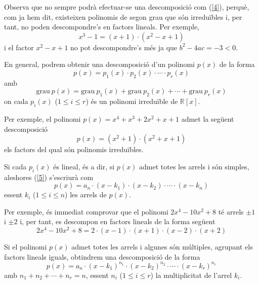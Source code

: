 Observa que no sempre podrà efectuar-se una descomposició com (\ref{4}), perquè, com ja hem dit, existeixen polinomis de segon grau que són
irreduïbles i, per tant, no poden descompondre's en factors lineals. Per exemple,
\begin{equation*}
x^{3}-1=(x+1)\cdot (x^{2}-x+1)
\end{equation*}i el factor $x^{2}-x+1$ no pot descompondre's més ja que $b^{2}-4ac=-3<0 $.

En general, podrem obtenir una descomposició d'un polinomi $p(x)$
de la forma\begin{equation}
p(x)=p_{1}(x)\cdot p_{2}(x)\cdot \cdots \cdot p_{r}(x) \label{5}
\end{equation}amb\begin{equation*}
\text{grau}~p(x)=\text{grau}~p_{1}(x)+\text{grau}~p_{2}(x)+\cdots +\text{grau}~p_{r}(x)
\end{equation*}on cada $p_{i}(x)$ ($1\leq i\leq r$) és un polinomi irreduïble de $\mathbb{R}[x]$.

Per exemple, el polinomi $p(x)=x^{4}+x^{3}+2x^{2}+x+1$ admet la següent
descomposició
\begin{equation*}
p(x)=(x^{2}+1)\cdot (x^{2}+x+1)
\end{equation*}els factors del qual són polinomis irreduïbles.

Si cada $p_{i}(x)$ és lineal, és a dir, si $p(x)$ admet totes les arrels i són simples, aleshores (\ref{5}) s'escriurà com\begin{equation*}
p(x)=a_{n}\cdot (x-k_{1})\cdot (x-k_{2})\cdot \cdots \cdot (x-k_{n})
\end{equation*}essent $k_{i}$ ($1\leq i\leq n$) les arrels de $p(x)$.

Per exemple, és immediat comprovar que el polinomi $2x^{4}-10x^{2}+8$
té arrels $\pm 1$ i $\pm 2$ i, per tant, es descompon en factors
lineals de la forma següent\begin{equation*}
2x^{4}-10x^{2}+8=2\cdot (x-1)\cdot (x+1)\cdot (x-2)\cdot (x+2)
\end{equation*}

Si el polinomi $p(x)$ admet totes les arrels i algunes són múltiples, agrupant els factors lineals iguals, obtindrem una
descomposició de la forma\begin{equation*}
p(x)=a_{n}\cdot (x-k_{1})^{n_{1}}\cdot (x-k_{2})^{n_{2}}\cdot \cdots \cdot
(x-k_{r})^{n_{r}}
\end{equation*}amb $n_{1}+n_{2}+\cdots +n_{r}=n$, essent $n_{i}$ ($1\leq i\leq r$) la
multiplicitat de l'arrel $k_{i}$.

